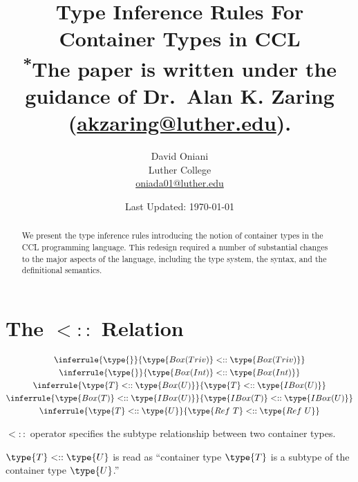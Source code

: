 \documentclass{article}
\author{David Oniani\\
        Luther College\\
        \href{mailto:oniada01@luther.edu}{oniada01@luther.edu}}
\title{\textbf{Type Inference Rules For Container Types in CCL}\\
       \medskip
       \small \textsuperscript{*}The paper is written under the guidance of
       Dr.\ Alan K. Zaring
       (\href{mailto:akzaring@luther.edu}{akzaring@luther.edu}).}
\date{Last Updated: \today}
\newcommand\subtypecont{\mathrel{<::}}
\begin{document}
\maketitle


\begin{abstract}
\noindent We present the type inference rules introducing the notion of
container types in the CCL programming language. This redesign required a
number of substantial changes to the major aspects of the language, including
the type system, the syntax, and the definitional semantics.
\end{abstract}


\section*{The $\subtypecont$ Relation}

\begin{gather}
  \inferrule{\type{}}{\type{Box(Triv)} \subtypecont \type{Box(Triv)}}\\
  \inferrule{\type{}}{\type{Box(Int)} \subtypecont \type{Box(Int)}}\\
  \inferrule{\type{T} \subtypecont \type{Box(U)}}{\type{T} \subtypecont \type{IBox(U)}}\\
  \inferrule{\type{Box(T)} \subtypecont \type{IBox(U)}}{\type{IBox(T)} \subtypecont \type{IBox(U)}}\\
  \inferrule{\type{T} \subtypecont \type{U}}{\type{Ref\ T} \subtypecont \type{Ref\ U}}
\end{gather}


$\subtypecont$ operator specifies the subtype relationship between two
container types.

\medskip

$\type{T} \subtypecont \type{U}$ is read as ``container type $\type{T}$ is a
subtype of the container type $\type{U}$.''

\end{document}
